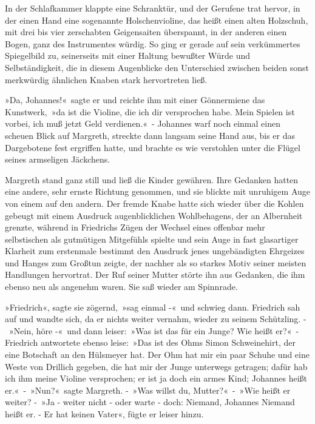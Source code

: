 In der Schlafkammer klappte eine Schranktür, und der Gerufene trat hervor, in der einen Hand eine sogenannte Holschenvioline, das heißt einen alten Holzschuh, mit drei bis vier zerschabten Geigensaiten überspannt, in der anderen einen Bogen, ganz des Instrumentes würdig. So ging er gerade auf sein verkümmertes Spiegelbild zu, seinerseits mit einer Haltung bewußter Würde und Selbständigkeit, die in diesem Augenblicke den Unterschied zwischen beiden sonst merkwürdig ähnlichen Knaben stark hervortreten ließ.

»Da, Johannes!« sagte er und reichte ihm mit einer Gönnermiene das Kunstwerk, »da ist die Violine, die ich dir versprochen habe. Mein Spielen ist vorbei, ich muß jetzt Geld verdienen.« - Johannes warf noch einmal einen scheuen Blick auf Margreth, streckte dann langsam seine Hand aus, bis er das Dargebotene fest ergriffen hatte, und brachte es wie verstohlen unter die Flügel seines armseligen Jäckchens.

Margreth stand ganz still und ließ die Kinder gewähren. Ihre Gedanken hatten eine andere, sehr ernste Richtung genommen, und sie blickte mit unruhigem Auge von einem auf den andern. Der fremde Knabe hatte sich wieder über die Kohlen gebeugt mit einem Ausdruck augenblicklichen Wohlbehagens, der an Albernheit grenzte, während in Friedrichs Zügen der Wechsel eines offenbar mehr selbstischen als gutmütigen Mitgefühls spielte und sein Auge in fast glasartiger Klarheit zum erstenmale bestimmt den Ausdruck jenes ungebändigten Ehrgeizes und Hanges zum Großtun zeigte, der nachher als so starkes Motiv seiner meisten Handlungen hervortrat. Der Ruf seiner Mutter störte ihn aus Gedanken, die ihm ebenso neu als angenehm waren. Sie saß wieder am Spinnrade.

»Friedrich«, sagte sie zögernd, »sag einmal -« und schwieg dann. Friedrich sah auf und wandte sich, da er nichts weiter vernahm, wieder zu seinem Schützling. - »Nein, höre -« und dann leiser: »Was ist das für ein Junge? Wie heißt er?« - Friedrich antwortete ebenso leise: »Das ist des Ohms Simon Schweinehirt, der eine Botschaft an den Hülsmeyer hat. Der Ohm hat mir ein paar Schuhe und eine Weste von Drillich gegeben, die hat mir der Junge unterwegs getragen; dafür hab ich ihm meine Violine versprochen; er ist ja doch ein armes Kind; Johannes heißt er.« - »Nun?« sagte Margreth. - »Was willst du, Mutter?« - »Wie heißt er weiter? - »Ja - weiter nicht - oder warte - doch: Niemand, Johannes Niemand heißt er. - Er hat keinen Vater«, fügte er leiser hinzu.

